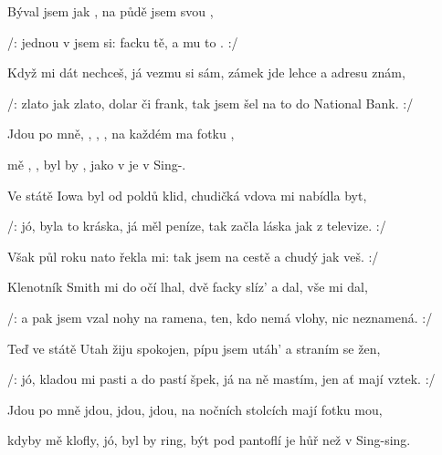

\zs
Býval jsem  jak  ,
na půdě  jsem  svou ,

/:  jednou v   jsem si: 
 facku tě, a  mu to . :/
\ks

\zs
Když mi dát nechceš, já vezmu si sám,
zámek jde lehce a adresu znám,

/: zlato jak zlato, dolar či frank,
tak jsem šel na to do National Bank. :/
\ks

\zr
Jdou po mně, , , ,
na každém  ma fotku ,

 mě , , byl by ,
 jako v  je v  Sing-.     
\kr

\zs
Ve státě Iowa byl od poldů klid,
chudičká vdova mi nabídla byt,

/: jó, byla to kráska, já měl peníze,
tak začla láska jak z televize. :/
\ks

\zs
Však půl roku nato řekla mi: 
tak jsem na cestě a chudý jak veš. :/
\ks

\zr  \kr

\zs
Klenotník Smith mi do očí lhal,
dvě facky slíz' a dal, vše mi dal,

/: a pak jsem vzal nohy na ramena,
ten, kdo nemá vlohy, nic neznamená. :/
\ks

\zs
Teď ve státě Utah žiju spokojen,
pípu jsem utáh' a straním se žen,

/: jó, kladou mi pasti a do pastí špek,
já na ně mastím, jen ať mají vztek. :/
\ks

\zr
Jdou po mně jdou, jdou, jdou,
na nočních stolcích mají fotku mou,

kdyby mě klofly, jó, byl by ring,
být pod pantoflí je hůř než v Sing-sing.
\kr

\kp





